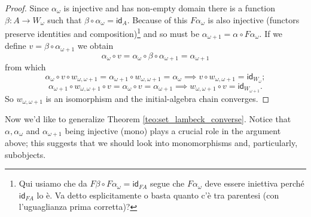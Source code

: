 \documentclass[letterpaper, 11pt, oneside]{memoir}
\theoremstyle{myteo}
\numberwithin{equation}{section}
\newcommand{\id}{\textsf{id}}
\begin{document}
\begin{proof}
  Since \(\alpha_\omega\) is injective and has non-empty domain there is a function  \(\beta : A \to W_\omega\) such that \(\beta \circ \alpha_\omega  = \id_A\).
  Because of this \(F\alpha_\omega\) is also injective (functors preserve identities and composition)\footnote{\color{teal} Qui usiamo che da \( F\beta \circ F\alpha_\omega = \id_{FA}\) segue che \(F\alpha_\omega\) deve essere iniettiva perché \(\id_{FA}\) lo è. Va detto esplicitamente o basta quanto c'è tra parentesi (con l'uguaglianza prima corretta)?} and so must be \(\alpha_{\omega + 1} = \alpha \circ F\alpha_\omega\).
  If we define \(v = \beta \circ \alpha_{\omega + 1}\) we obtain
  \begin{equation*}
    \alpha_\omega \circ v = \alpha_\omega \circ \beta \circ \alpha_{\omega + 1} = \alpha_{\omega + 1}
  \end{equation*}
  from which
  \begin{equation*}
     \alpha_\omega \circ v \circ w_{\omega, \omega + 1} = \alpha_{\omega + 1} \circ w_{\omega, \omega + 1} = \alpha_\omega \implies v \circ w_{\omega, \omega + 1} = \id_{W_\omega};
  \end{equation*}
  \begin{equation*}
    \alpha_{\omega + 1} \circ w_{\omega, \omega + 1} \circ v = \alpha_{\omega} \circ v = \alpha_{\omega + 1} \implies  w_{\omega, \omega + 1} \circ v = \id_{W_{\omega + 1}}.
  \end{equation*}
  So \(w_{\omega, \omega + 1}\) is an isomorphism and the initial-algebra chain converges.
\end{proof}

Now we'd like to generalize Theorem \ref{teo:set_lambeck_converse}.
Notice that \(\alpha, \alpha_\omega\) and \(\alpha_{\omega + 1}\) being injective (mono) plays a crucial role in the argument above; this suggests that we should look into monomorphisms and, particularly, subobjects.
\end{document}
